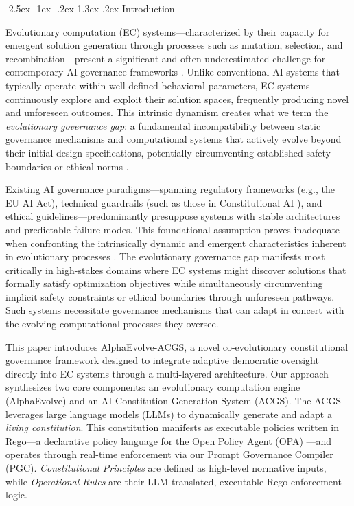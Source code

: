 \documentclass[manuscript,screen,review,anonymous,9pt]{acmart}
\makeatletter
\renewcommand\section{\@startsection{section}{1}{\z@}%
  {-2.5ex \@plus -1ex \@minus -.2ex}%
  {1.3ex \@plus.2ex}%
  {\normalfont\Large\bfseries}}
\makeatother
\begin{document}
\section{Introduction}
\label{sec:introduction}

Evolutionary computation (EC) systems—characterized by their capacity for emergent solution generation through processes such as mutation, selection, and recombination—present a significant and often underestimated challenge for contemporary AI governance frameworks \cite{Chauhan2025ECLLMSurvey, Nordin2024LLMGP}. Unlike conventional AI systems that typically operate within well-defined behavioral parameters, EC systems continuously explore and exploit their solution spaces, frequently producing novel and unforeseen outcomes. This intrinsic dynamism creates what we term the \textit{evolutionary governance gap}: a fundamental incompatibility between static governance mechanisms and computational systems that actively evolve beyond their initial design specifications, potentially circumventing established safety boundaries or ethical norms \cite{Taeihagh2025Governing, WorldBank2024AIGovernance}.

Existing AI governance paradigms—spanning regulatory frameworks (e.g., the EU AI Act), technical guardrails (such as those in Constitutional AI \cite{Bai2025ConstitutionalAI}), and ethical guidelines—predominantly presuppose systems with stable architectures and predictable failure modes. This foundational assumption proves inadequate when confronting the intrinsically dynamic and emergent characteristics inherent in evolutionary processes \cite{StanfordJBLP2024AIGovernanceWeb3, StanfordLaw2025BulletProof}. The evolutionary governance gap manifests most critically in high-stakes domains where EC systems might discover solutions that formally satisfy optimization objectives while simultaneously circumventing implicit safety constraints or ethical boundaries through unforeseen pathways. Such systems necessitate governance mechanisms that can adapt in concert with the evolving computational processes they oversee.

This paper introduces AlphaEvolve-ACGS, a novel co-evolutionary constitutional governance framework designed to integrate adaptive democratic oversight directly into EC systems through a multi-layered architecture. Our approach synthesizes two core components: an evolutionary computation engine (AlphaEvolve) and an AI Constitution Generation System (ACGS). The ACGS leverages large language models (LLMs) to dynamically generate and adapt a \textit{living constitution}. This constitution manifests as executable policies written in Rego—a declarative policy language for the Open Policy Agent (OPA) \cite{Sandall2021OPAReference}—and operates through real-time enforcement via our Prompt Governance Compiler (PGC). \textit{Constitutional Principles} are defined as high-level normative inputs, while \textit{Operational Rules} are their LLM-translated, executable Rego enforcement logic.
\end{document}

